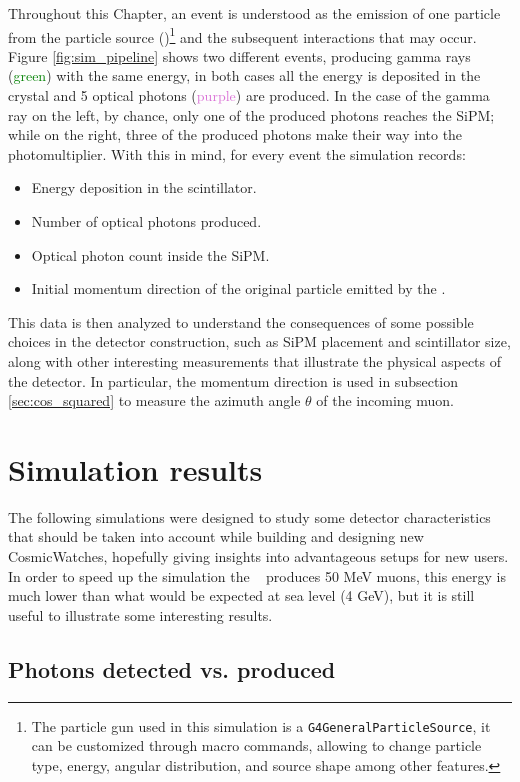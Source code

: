 Throughout this Chapter, an event is understood as the emission of one particle from the particle source (\gps)\footnote{The particle gun used in this simulation is a \texttt{G4GeneralParticleSource}, it can be customized through macro commands, allowing to change particle type, energy, angular distribution, and source shape among other features.} and the subsequent interactions that may occur. Figure \ref{fig:sim_pipeline} shows two different events, producing gamma rays (\textcolor{green}{green}) with the same energy, in both cases all the energy is deposited in the crystal and 5 optical photons (\textcolor{Orchid}{purple}) are produced. In the case of the gamma ray on the left, by chance, only one of the produced photons reaches the SiPM; while on the right, three of the produced photons make their way into the photomultiplier. With this in mind, for every event the simulation records:
\begin{itemize}
  \item Energy deposition in the scintillator.
  \item Number of optical photons produced.
  \item Optical photon count inside the SiPM.
  \item Initial momentum direction of the original particle emitted by the \gps.
\end{itemize}

This data is then analyzed to understand the consequences of some possible choices in the detector construction, such as SiPM placement and scintillator size, along with other interesting measurements that illustrate the physical aspects of the detector. In particular, the momentum direction is used in subsection \ref{sec:cos_squared} to measure the azimuth angle $\theta$ of the incoming muon.

\section{Simulation results}

The following simulations were designed to study some detector characteristics that should be taken into account while building and designing new CosmicWatches, hopefully giving insights into advantageous setups for new users. In order to speed up the simulation the \gps~ produces 50 \unit{\mega\eV} muons, this energy is much lower than what would be expected at sea level (4 \unit{\giga\eV}), but it is still useful to illustrate some interesting results.

\subsection{Photons detected vs. produced}\label{sec:collected_produced}

